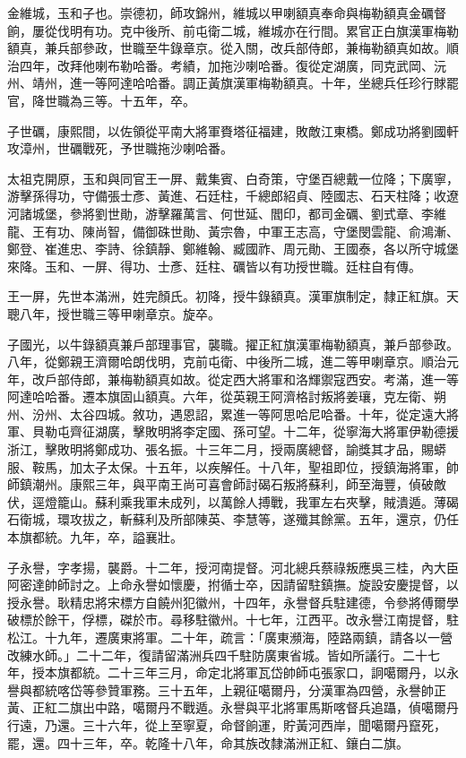 \begin{pinyinscope}
金維城，玉和子也。崇德初，師攻錦州，維城以甲喇額真奉命與梅勒額真金礪督餉，屢從伐明有功。克中後所、前屯衛二城，維城亦在行間。累官正白旗漢軍梅勒額真，兼兵部參政，世職至牛錄章京。從入關，改兵部侍郎，兼梅勒額真如故。順治四年，改拜他喇布勒哈番。考績，加拖沙喇哈番。復從定湖廣，同克武岡、沅州、靖州，進一等阿達哈哈番。調正黃旗漢軍梅勒額真。十年，坐總兵任珍行賕罷官，降世職為三等。十五年，卒。

子世礪，康熙間，以佐領從平南大將軍賚塔征福建，敗敵江東橋。鄭成功將劉國軒攻漳州，世礪戰死，予世職拖沙喇哈番。

太祖克開原，玉和與同官王一屏、戴集賓、白奇策，守堡百總戴一位降；下廣寧，游擊孫得功，守備張士彥、黃進、石廷柱，千總郎紹貞、陸國志、石天柱降；收遼河諸城堡，參將劉世勛，游擊羅萬言、何世延、閻印，都司金礪、劉式章、李維龍、王有功、陳尚智，備御硃世勛、黃宗魯，中軍王志高，守堡閔雲龍、俞鴻漸、鄭登、崔進忠、李詩、徐鎮靜、鄭維翰、臧國祚、周元勛、王國泰，各以所守城堡來降。玉和、一屏、得功、士彥、廷柱、礪皆以有功授世職。廷柱自有傳。

王一屏，先世本滿洲，姓完顏氏。初降，授牛錄額真。漢軍旗制定，隸正紅旗。天聰八年，授世職三等甲喇章京。旋卒。

子國光，以牛錄額真兼戶部理事官，襲職。擢正紅旗漢軍梅勒額真，兼戶部參政。八年，從鄭親王濟爾哈朗伐明，克前屯衛、中後所二城，進二等甲喇章京。順治元年，改戶部侍郎，兼梅勒額真如故。從定西大將軍和洛輝禦寇西安。考滿，進一等阿達哈哈番。遷本旗固山額真。六年，從英親王阿濟格討叛將姜瓖，克左衛、朔州、汾州、太谷四城。敘功，遇恩詔，累進一等阿思哈尼哈番。十年，從定遠大將軍、貝勒屯齊征湖廣，擊敗明將李定國、孫可望。十二年，從寧海大將軍伊勒德援浙江，擊敗明將鄭成功、張名振。十三年二月，授兩廣總督，諭獎其才品，賜蟒服、鞍馬，加太子太保。十五年，以疾解任。十八年，聖祖即位，授鎮海將軍，帥師鎮潮州。康熙三年，與平南王尚可喜會師討碣石叛將蘇利，師至海豐，偵破敵伏，逕燈籠山。蘇利乘我軍未成列，以萬餘人搏戰，我軍左右夾擊，賊潰遁。薄碣石衛城，環攻拔之，斬蘇利及所部陳英、李慧等，遂殲其餘黨。五年，還京，仍任本旗都統。九年，卒，謚襄壯。

子永譽，字孝揚，襲爵。十二年，授河南提督。河北總兵蔡祿叛應吳三桂，內大臣阿密達帥師討之。上命永譽如懷慶，拊循士卒，因請留駐鎮撫。旋設安慶提督，以授永譽。耿精忠將宋標方自饒州犯徽州，十四年，永譽督兵駐建德，令參將傅爾學破標於餘干，俘標，磔於市。尋移駐徽州。十七年，江西平。改永譽江南提督，駐松江。十九年，遷廣東將軍。二十年，疏言：「廣東瀕海，陸路兩鎮，請各以一營改練水師。」二十二年，復請留滿洲兵四千駐防廣東省城。皆如所議行。二十七年，授本旗都統。二十三年三月，命定北將軍瓦岱帥師屯張家口，詗噶爾丹，以永譽與都統喀岱等參贊軍務。三十五年，上親征噶爾丹，分漢軍為四營，永譽帥正黃、正紅二旗出中路，噶爾丹不戰遁。永譽與平北將軍馬斯喀督兵追躡，偵噶爾丹行遠，乃還。三十六年，從上至寧夏，命督餉運，貯黃河西岸，聞噶爾丹竄死，罷，還。四十三年，卒。乾隆十八年，命其族改隸滿洲正紅、鑲白二旗。


\end{pinyinscope}
